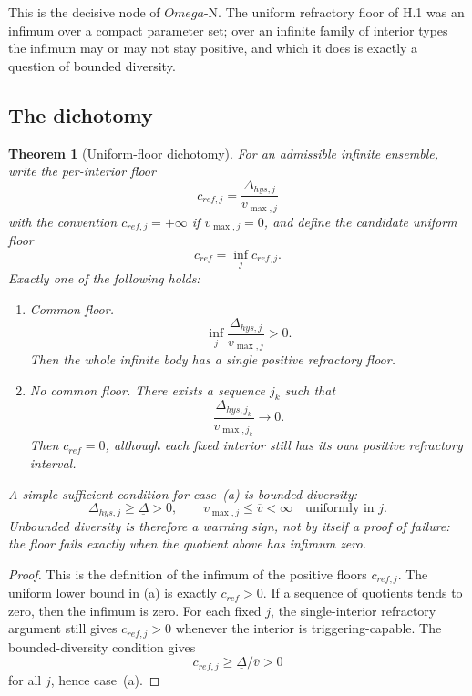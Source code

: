 \documentclass[11pt,a4paper]{article}
\def\Omega{Omega}%
\def\mathfrak#1{#1}%
\def\mathrm#1{#1}%
\def\emph#1{#1}%
\theoremstyle{definition}
\theoremstyle{plain}
\newtheorem{theorem}[definition]{Theorem}
\theoremstyle{remark}
\begin{document}
This is the decisive node of $\Omega$-N. The uniform refractory floor of H.1 was an infimum
over a \emph{compact} parameter set; over an infinite family of interior types the infimum may
or may not stay positive, and which it does is exactly a question of bounded diversity.

\subsection{The dichotomy}

\begin{theorem}[Uniform-floor dichotomy]\label{thm:floordichotomy}
For an admissible infinite ensemble, write the per-interior floor
\[
\mathfrak c_{\mathrm{ref},j}
=
\frac{\Delta_{\mathrm{hys},j}}{v_{\max,j}}
\]
with the convention \(\mathfrak c_{\mathrm{ref},j}=+\infty\) if \(v_{\max,j}=0\),
and define the candidate uniform floor
\[
\mathfrak c_{\mathrm{ref}}
=
\inf_j\mathfrak c_{\mathrm{ref},j}.
\]
Exactly one of the following holds:
\begin{enumerate}[label=\textup{(\alph*)},leftmargin=1.2cm]
\item \emph{Common floor.}
\[
\inf_j\frac{\Delta_{\mathrm{hys},j}}{v_{\max,j}}>0.
\]
Then the whole infinite body has a single positive refractory floor.

\item \emph{No common floor.}
There exists a sequence \(j_k\) such that
\[
\frac{\Delta_{\mathrm{hys},j_k}}{v_{\max,j_k}}\to0.
\]
Then \(\mathfrak c_{\mathrm{ref}}=0\), although each fixed interior still has its
own positive refractory interval.
\end{enumerate}
A simple sufficient condition for case~(a) is bounded diversity:
\[
\Delta_{\mathrm{hys},j}\ge\underline\Delta>0,
\qquad
v_{\max,j}\le\overline v<\infty
\quad\text{uniformly in }j.
\]
Unbounded diversity is therefore a warning sign, not by itself a proof of failure:
the floor fails exactly when the quotient above has infimum zero.
\end{theorem}

\begin{proof}
This is the definition of the infimum of the positive floors
\(\mathfrak c_{\mathrm{ref},j}\). The uniform lower bound in (a) is exactly
\(\mathfrak c_{\mathrm{ref}}>0\). If a sequence of quotients tends to zero, then
the infimum is zero. For each fixed \(j\), the single-interior refractory argument
still gives \(\mathfrak c_{\mathrm{ref},j}>0\) whenever the interior is
triggering-capable. The bounded-diversity condition gives
\[
\mathfrak c_{\mathrm{ref},j}
\ge
\underline\Delta/\overline v>0
\]
for all \(j\), hence case~(a). \qedhere
\end{proof}
\end{document}
